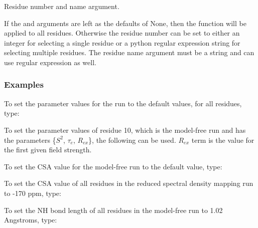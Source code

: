 Residue number and name argument.

If the 
 and 
 arguments are left as the defaults of None, then the
function will be applied to all residues.  Otherwise the residue number can be set to either
an integer for selecting a single residue or a python regular expression string for
selecting multiple residues.  The residue name argument must be a string and can use regular
expression as well.


\subsubsection{Examples}

To set the parameter values for the run 
 to the default values, for all residues,
type:




To set the parameter values of residue 10, which is the model-free run 
 and has the
parameters \{$S^2$, $\tau_e$, $R_{ex}$\}, the following can be used.  $R_{ex}$ term is the value for the first
given field strength.





To set the CSA value for the model-free run 
 to the default value, type:




To set the CSA value of all residues in the reduced spectral density mapping run 
 to
-170 ppm, type:





To set the NH bond length of all residues in the model-free run 
 to 1.02 Angstroms,
type:





